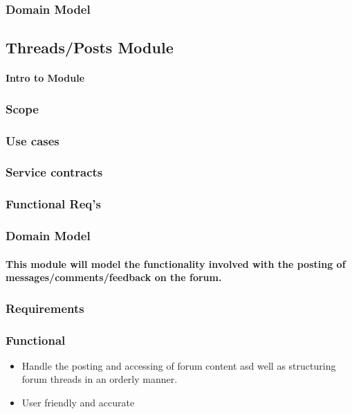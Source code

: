 \documentclass[12pt]{article}
\begin{document}
\subsubsection{Domain Model}
\par{}

\newpage
\subsection{Threads/Posts Module}
\paragraph{Intro to Module}
\subsubsection{Scope}
\subsubsection{Use cases}
\subsubsection{Service contracts}
\subsubsection{Functional Req's}
\subsubsection{Domain Model}

\paragraph{This module will model the functionality involved with the posting of messages/comments/feedback on the forum.}

\subsubsection{Requirements}
\subsubsection*{Functional}
\begin{itemize}
\item Handle the posting and accessing of forum content asd well as structuring forum threads in an orderly manner.
\item User friendly and accurate
\end{itemize}
\end{document}
